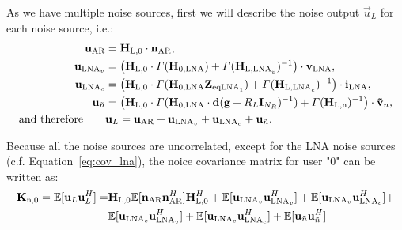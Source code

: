 As we have multiple noise sources, first we will describe the noise output $\vec{u}_L$ for each noise source, i.e.:
\begin{align}
\label{eq:noise_output}
\nonumber
\mathbf{u}_\text{AR} &= \mathbf{H}_\text{L,0}\cdot\mathbf{n}_\text{AR},\\\nonumber 
\mathbf{u}_{\text{LNA}_v} &= \left(\mathbf{H}_\text{L,0}\cdot\Gamma(\mathbf{H}_\text{0,LNA})+\Gamma(\mathbf{H}_{\text{L,LNA}_v})^{-1}\right)\cdot\mathbf{v}_\text{LNA},\\\nonumber
\mathbf{u}_{\text{LNA}_c} &= \left(\mathbf{H}_\text{L,0}\cdot\Gamma(\mathbf{H}_\text{0,LNA}\mathbf{Z}_{\text{eqLNA}_1})+\Gamma(\mathbf{H}_{\text{L,LNA}_c})^{-1}\right)\cdot\mathbf{i}_\text{LNA},\\\nonumber
\mathbf{u}_{\tilde{n}} &= \left(\mathbf{H}_\text{L,0}\cdot\Gamma(\mathbf{H}_\text{0,LNA}\cdot\mathbf{d}(\mathbf{g}+R_L\mathbf{I}_{N_R})^{-1})+\Gamma(\mathbf{H}_\text{L,n})^{-1}\right)\cdot\mathbf{\tilde{v}}_{n},\\
\text{and therefore}\qquad &\mathbf{u}_L = \mathbf{u}_\text{AR} + \mathbf{u}_{\text{LNA}_v} + \mathbf{u}_{\text{LNA}_c} + \mathbf{u}_{\tilde{n}}.
\end{align}

Because all the noise sources are uncorrelated, except for the LNA noise sources (c.f. Equation~\eqref{eq:cov_lna}), the noice covariance matrix for user "0" can be written as:
\begin{align}
\label{eq:exp_noise}\nonumber
\mat{K}_\text{n,0} =\mathbb{E}[\vec{u}_L\vec{u}_L^H] = &\mat{H}_\text{L,0}\mathbb{E}[\vec{n}_\text{AR}\vec{n}_\text{AR}^H]\mat{H}_\text{L,0}^H + 
\mathbb{E}[\vec{u}_{\text{LNA}_v}\vec{u}_{\text{LNA}_v}^H] +
\mathbb{E}[\vec{u}_{\text{LNA}_v}\vec{u}_{\text{LNA}_c}^H] +\\%
\quad&\mathbb{E}[\vec{u}_{\text{LNA}_c}\vec{u}_{\text{LNA}_v}^H] +
\mathbb{E}[\vec{u}_{\text{LNA}_c}\vec{u}_{\text{LNA}_c}^H] +
\mathbb{E}[\vec{u}_{\tilde{n}}\vec{u}_{\tilde{n}}^H]
\end{align}

